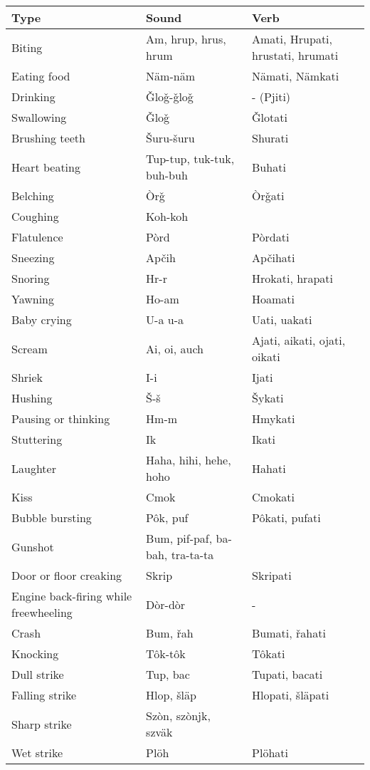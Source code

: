 \begin{longtable}{p{10em}p{5em}p{5em}}
		\textbf{Type} & \textbf{Sound} & \textbf{Verb} \\
		\endhead
		Biting & Am, hrup, hrus, hrum & Amati, Hrupati, hrustati, hrumati \\
		Eating food & Näm-näm & Nämati, Nämkati \\
		Drinking & Ǧloǧ-ǧloǧ & - (Pjiti) \\
		Swallowing & Ǧloǧ & Ǧlotati \\
		Brushing teeth & Šuru-šuru & Shurati \\
		Heart beating & Tup-tup, tuk-tuk, buh-buh & Buhati \\
		Belching & Òrǧ & Òrǧati \\
		Coughing & Koh-koh & \\
		Flatulence & Pòrd & Pòrdati \\
		Sneezing & Apčih & Apčihati \\
		Snoring & Hr-r & Hrokati, hrapati \\
		Yawning & Ho-am & Hoamati \\
		Baby crying & U-a u-a & Uati, uakati \\
		Scream & Ai, oi, auch & Ajati, aikati, ojati, oikati \\
		Shriek & I-i & Ijati \\
		Hushing & Š-š & Šykati \\
		Pausing or thinking & Hm-m & Hmykati \\
		Stuttering & Ik & Ikati \\
		Laughter & Haha, hihi, hehe, hoho & Hahati \\
		Kiss & Cmok & Cmokati \\
		Bubble bursting & Pôk, puf & Pôkati, pufati \\
		Gunshot & Bum, pif-paf, ba-bah, tra-ta-ta & \\
		Door or floor creaking & Skrip & Skripati \\
		Engine back-firing while freewheeling & Dòr-dòr & - \\
		Crash & Bum, řah & Bumati, řahati \\
		Knocking & Tôk-tôk & Tôkati \\ 
		Dull strike & Tup, bac & Tupati, bacati \\
		Falling strike & Hlop, šläp & Hlopati, šläpati \\
		Sharp strike & Szòn, szònjk, szväk & \\
		Wet strike & Plöh & Plöhati \\

\end{longtable}
